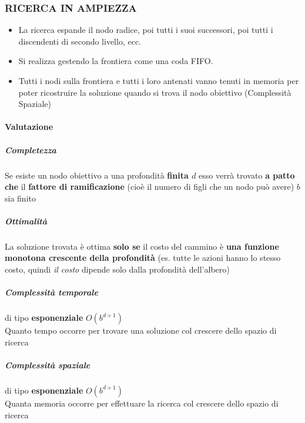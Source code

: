 \documentclass[14pt]{extarticle}
\begin{document}
\subsubsection{RICERCA IN AMPIEZZA}
\begin{itemize}
    \item La ricerca espande il nodo radice, poi tutti i suoi successori, poi tutti i discendenti di secondo livello, ecc.
    \item Si realizza gestendo la frontiera come una coda FIFO.
    \item Tutti i nodi sulla frontiera e tutti i loro antenati vanno tenuti in memoria per poter ricostruire la soluzione quando si trova il nodo obiettivo (Complessità Spaziale)
\end{itemize}
\paragraph{Valutazione}
\subparagraph{Completezza}
Se esiste un nodo obiettivo a una profondità \textbf{finita $d$} esso verrà
trovato \textbf{a patto che} il \textbf{fattore di ramificazione} (cioè il numero di figli che un nodo può avere) $b$ sia finito
\subparagraph{Ottimalità}
La soluzione trovata è ottima \textbf{solo se} il costo del cammino è
\textbf{una funzione monotona crescente della profondità} (es. tutte le azioni hanno lo stesso costo, quindi \textit{il costo} dipende solo dalla profondità dell'albero)
\subparagraph{Complessità temporale}
di tipo \textbf{esponenziale} $O(b^{d+1})$\\
Quanto tempo occorre per trovare una soluzione col crescere dello spazio di ricerca
\subparagraph{Complessità spaziale}
di tipo \textbf{esponenziale} $O(b^{d+1})$\\
Quanta memoria occorre per effettuare la ricerca col crescere dello spazio di ricerca
\end{document}
